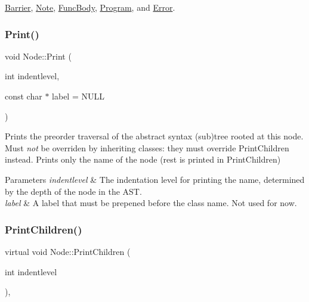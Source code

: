 \hyperlink{class_barrier_a3b32a126f5fb975defc7f8c3614a0c68}{Barrier}, \hyperlink{class_note_ae38717d9af17947262aa3f4a1d473363}{Note}, \hyperlink{class_func_body_ae2e7c93a201a73256289ecbb59455961}{Func\+Body}, \hyperlink{class_program_a42317e4371887f452b38b7a729a7533c}{Program}, and \hyperlink{class_error_a610f5e77ca0a86ae8981ac3ed7820bf3}{Error}.

\mbox{\label{class_node_a9ef727fd72d1a37792b3db60a8a479dd}} 
\subsubsection{\texorpdfstring{Print()}{Print()}}
{\footnotesize\ttfamily void Node\+::\+Print (\begin{DoxyParamCaption}\item[{int}]{indentlevel,  }\item[{const char $\ast$}]{label = {\ttfamily NULL} }\end{DoxyParamCaption})}

Prints the preorder traversal of the abstract syntax (sub)tree rooted at this node. Must {\itshape not} be overriden by inheriting classes\+: they must override Print\+Children instead. Prints only the name of the node (rest is printed in Print\+Children) 
\begin{DoxyParams}{Parameters}
{\em indentlevel} & The indentation level for printing the name, determined by the depth of the node in the A\+ST. \\
\hline
{\em label} & A label that must be prepened before the class name. Not used for now. \\
\hline
\end{DoxyParams}
\mbox{\label{class_node_a3e67ec8d22182b721717af14fe0c3000}} 
\subsubsection{\texorpdfstring{Print\+Children()}{PrintChildren()}}
{\footnotesize\ttfamily virtual void Node\+::\+Print\+Children (\begin{DoxyParamCaption}\item[{int}]{indentlevel }\end{DoxyParamCaption})\hspace{0.3cm}{\ttfamily [inline]}, {\ttfamily [virtual]}}

